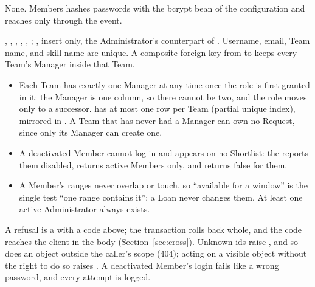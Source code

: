 None. Members hashes passwords with the bcrypt  bean of the  configuration and reaches  only through the  event.

{\raggedright{}, , , , , ; , insert only, the Administrator's counterpart of . Username, email, Team name, and skill name are unique. A composite foreign key from  to  keeps every Team's Manager inside that Team.\par}

\begin{itemize}
\item Each Team has exactly one Manager at any time once the role is first granted in it: the Manager is one column, so there cannot be two, and the role moves only to a successor.  has at most one  row per Team (partial unique index), mirrored in . A Team that has never had a Manager can own no Request, since only its Manager can create one.
\item A deactivated Member cannot log in and appears on no Shortlist: the  reports them disabled,  returns active Members only, and  returns false for them.
\item A Member's ranges never overlap or touch, so ``available for a window'' is the single test ``one range contains it''; a Loan never changes them. At least one active Administrator always exists.
\end{itemize}

A refusal is a  with a code above; the transaction rolls back whole, and the code reaches the client in the  body (Section~\ref{sec:cross}). Unknown ids raise , and so does an object outside the caller's scope (404); acting on a visible object without the right to do so raises . A deactivated Member's login fails like a wrong password, and every attempt is logged.

